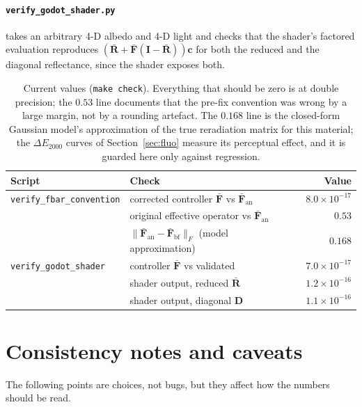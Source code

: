 \documentclass[11pt,a4paper]{article}
\newcommand{\mRb}{\bar{\mathbf{R}}}
\newcommand{\mFb}{\bar{\mathbf{F}}}
\newcommand{\mI}{\mathbf{I}}
\newcommand{\vc}{\mathbf{c}}
\newcommand{\dE}{\Delta E_{2000}}
\newcommand{\file}[1]{\texttt{#1}}
\newcommand{\code}[1]{\texttt{#1}}
\begin{document}
\paragraph{\file{verify\_godot\_shader.py}} takes an arbitrary 4-D albedo and
4-D light and checks that the shader's factored evaluation reproduces
$(\mRb+\mFb(\mI-\mRb))\vc$ for both the reduced and the diagonal reflectance,
since the shader exposes both.

\begin{table}[h]\centering\small
\begin{tabular}{@{}llr@{}}
\toprule
Script & Check & Value \\
\midrule
\file{verify\_fbar\_convention} & corrected controller $\mFb$ vs $\mFb_{\text{an}}$ & $8.0\times10^{-17}$ \\
                                & original effective operator vs $\mFb_{\text{an}}$ & $0.53$ \\
                                & $\|\mFb_{\text{an}}-\mFb_{\text{bf}}\|_F$ (model approximation) & $0.168$ \\
\file{verify\_godot\_shader}    & controller $\mFb$ vs validated & $7.0\times10^{-17}$ \\
                                & shader output, reduced $\mRb$ & $1.2\times10^{-16}$ \\
                                & shader output, diagonal $\mathbf D$ & $1.1\times10^{-16}$ \\
\bottomrule
\end{tabular}
\caption{Current values (\code{make check}).  Everything that should be zero
is at double precision; the $0.53$ line documents that the pre-fix convention
was wrong by a large margin, not by a rounding artefact.  The $0.168$ line is
the closed-form Gaussian model's approximation of the true reradiation matrix
for this material; the $\dE$ curves of Section~\ref{sec:fluo} measure its
perceptual effect, and it is guarded here only against regression.}
\label{tab:checks}
\end{table}

\section{Consistency notes and caveats}
\label{sec:caveats}

The following points are choices, not bugs, but they affect how the numbers
should be read.
\end{document}
